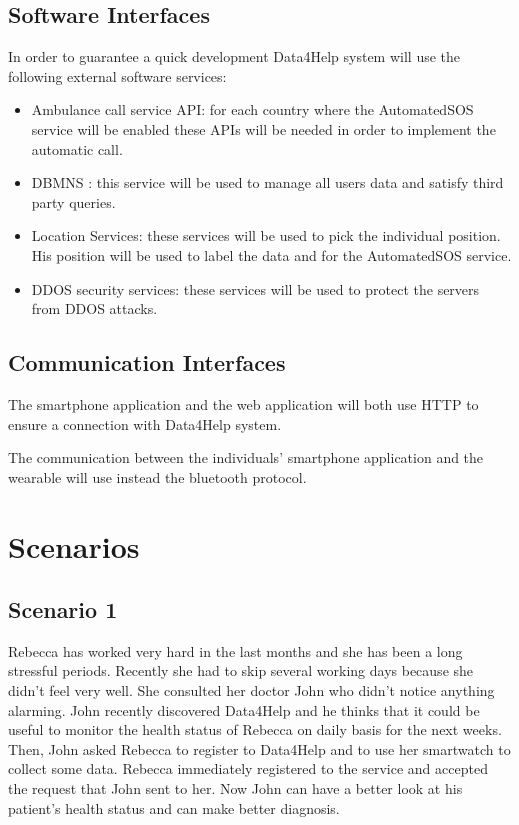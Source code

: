 \subsection{Software Interfaces}
In order to guarantee a quick development Data4Help system will use the following external software services:
\begin{itemize}
\item Ambulance call service API: for each country where the AutomatedSOS service will be enabled these APIs will be needed in order to implement the automatic call.
\item DBMNS : this service will be used to manage all users data and satisfy third party queries.
\item Location Services: these services will be used to pick the individual position. His position will be used to label the data and for the AutomatedSOS service.
\item DDOS security services: these services will be used to protect the servers from DDOS attacks.
\end{itemize}

\subsection{Communication Interfaces}
The smartphone application and the web application will both use HTTP to ensure a connection with Data4Help system.

The communication between the individuals' smartphone application and the wearable will use instead the bluetooth protocol.

\section{Scenarios}
\subsection{Scenario 1}

Rebecca has worked very hard in the last months and she has been a long stressful periods. Recently she had to skip several working days because she didn't feel very well. 
She consulted her doctor John who didn't notice anything alarming.
John recently discovered Data4Help and he thinks that it could be useful to monitor the health status of Rebecca on daily basis for the next weeks.
Then, John asked Rebecca to register to Data4Help and to use her smartwatch to collect some data.
Rebecca immediately registered to the service and accepted the request that John sent to her.
Now John can have a better look at his patient's health status and can make better diagnosis.


